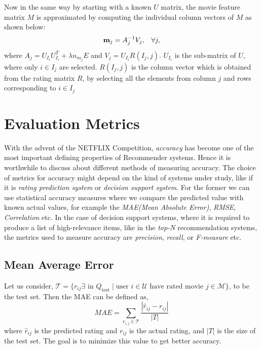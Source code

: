 Now in the same way by starting with a known $U$ matrix, the movie feature
matrix $M$ is approximated by computing the individual column vectors of $M$ as
shown below: \\
\begin{align*}
 & \bold{m}_j=A_{j}^{-1}V_j, & \forall j,
\end{align*}
where $A_j=U_{I_{i}}U_{I_{i}}^T+\lambda n_{m_{j}}E$ and $V_j=U_{I_{i}}R(I_j,j)$.
$U_{I_{i}}$ is the sub-matrix of $U$, where only $i \in I_j$ are selected.
$R(I_j,j)$ is the column vector which is obtained from the rating matrix $R$, by
selecting all the elements from column $j$ and rows corresponding to $i \in I_j$

\section{Evaluation Metrics}
With the advent of the NETFLIX Competition, \emph{accuracy} has become one of
the most important defining properties of Recommender systems. Hence it is
worthwhile to discuss about different methods of measuring accuracy. The choice
of metrics for accuracy might depend on the kind of systems under study, like if
it is \emph{rating prediction system} or \emph{decision support system}. For the
former we can use statistical accuracy measures where we compare the predicted
value with known actual values, for example the \emph{MAE(Mean Absolute Error)},
\emph{RMSE}, \emph{Correlation} etc. In the case of decision support systems,
where it is required to produce a list of high-relevance items, like in the
\emph{top-N} recommendation systems, the metrics used to measure accuracy are
\emph{precision}, \emph{recall}, or \emph{F-measure} etc. 

\subsection{Mean Average Error}
Let us consider, $\mathcal{T} = \{r_{ij} \exists \mbox{ in } Q_{\text{test}}
\mid \mbox{user } i
\in \mathcal{U} \mbox{ have rated movie } j \in \mathcal{M} \}$, to be the test
set. Then the MAE can be defined as,
\begin{equation}
 MAE = \sum_{r_{i,j}\in{\mathcal{T}}}\frac{|\hat{r}_{ij}-r_{ij}|}{|T|}
\end{equation}
where $\hat{r}_{ij}$ is the predicted rating and $r_{ij}$ is the actual rating,
and $|T|$ is the size of the test set. The goal is to minimize this value to get
better accuracy.

